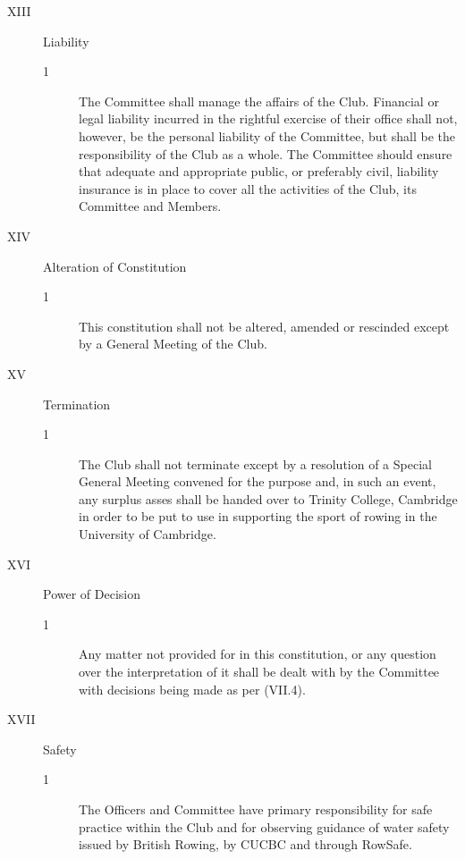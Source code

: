 \documentclass{article}
\begin{document}
\begin{description}
\begin{description}
\begin{description}
	\end{description}
	\end{description}
	
	\item[XIII] Liability
	\begin{description}
		\item[1] The Committee shall manage the affairs of the Club. Financial or legal
		liability incurred in the rightful exercise of their office shall not, however, be
		the personal liability of the Committee, but shall be the responsibility of the
		Club as a whole. The Committee should ensure that adequate and appropriate
		public, or preferably civil, liability insurance is in place to cover all the
		activities of the Club, its Committee and Members.\\
	\end{description}
	
	\item[XIV] Alteration of Constitution
	\begin{description}
		\item[1] This constitution shall not be altered, amended or rescinded except by a
		General Meeting of the Club.\\
	\end{description}

	\item[XV] Termination
	\begin{description}
		\item[1] The Club shall not terminate except by a resolution of a Special General
		Meeting convened for the purpose and, in such an event, any surplus asses
		shall be handed over to Trinity College, Cambridge in order to be put to use in
		supporting the sport of rowing in the University of Cambridge.\\
	\end{description}

	\item[XVI] Power of Decision
	\begin{description}
		\item[1] Any matter not provided for in this constitution, or any question over the
		interpretation of it shall be dealt with by the Committee with decisions being
		made as per (VII.4).\\
	\end{description}
	
	\item[XVII] Safety
	\begin{description}
		\item[1]  The Officers and Committee have primary responsibility for safe practice
		within the Club and for observing guidance of water safety issued by British
		Rowing, by CUCBC and through RowSafe.
	\end{description}
\end{description} 
\end{document}
